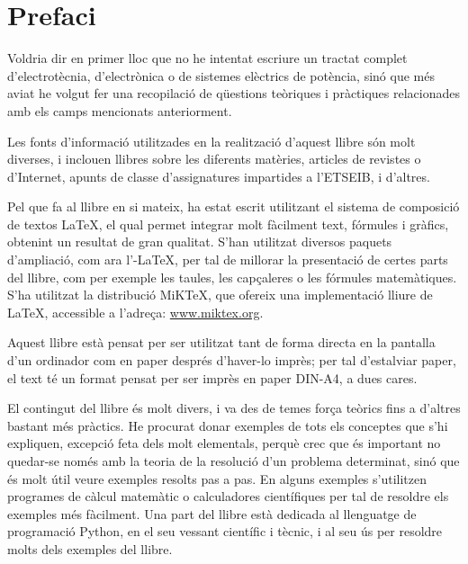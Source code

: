 \chapter*{Prefaci} 

   Voldria dir en primer lloc que no he intentat escriure un tractat complet
   d'electrotècnia, d'electrònica o de sistemes elèctrics de potència, sinó que més aviat
   he volgut
   fer una recopilació de qüestions teòriques i pràctiques relacionades amb els camps mencionats
   anteriorment.

   Les fonts d'informació utilitzades en la realització d'aquest llibre són molt diverses,
   i inclouen llibres sobre les diferents matèries, articles de revistes o d'Internet,
   apunts de classe d'assignatures impartides a l'ETSEIB, i d'altres.

   Pel que fa al llibre en si mateix, ha estat escrit utilitzant el sistema de composició de
   textos \LaTeX, el qual
   permet integrar molt fàcilment text, fórmules i gràfics, obtenint un resultat de
   gran qualitat. S'han utilitzat diversos paquets d'ampliació, com ara
   l'\AmS-\LaTeX,
   per tal de millorar la presentació de certes parts del
   llibre, com per exemple les taules, les capçaleres o les fórmules matemàtiques. S'ha utilitzat la distribució MiK\TeX, que ofereix una implementació lliure de \LaTeX , accessible a l'adreça: \href{http://www.miktex.org/}{www.miktex.org}.

   Aquest llibre està pensat per  ser utilitzat tant de forma directa en la pantalla d'un
   ordinador com en paper després d'haver-lo imprès; per tal d'estalviar paper, el text
   té un format pensat per  ser imprès en paper DIN-A4, a dues cares.

    El contingut del llibre és molt divers, i va des de temes força teòrics fins a
    d'altres bastant més pràctics. He procurat donar exemples de tots els conceptes
    que s'hi expliquen, excepció feta dels molt elementals, perquè crec que és important
     no quedar-se només amb la teoria de  la resolució d'un problema determinat, sinó que
     és molt útil veure exemples resolts pas a pas. En alguns exemples s'utilitzen programes de càlcul matemàtic o calculadores científiques per tal de resoldre els exemples més fàcilment. Una part  del llibre està dedicada al llenguatge de programació Python, en el seu vessant científic i tècnic, i al seu ús  per resoldre molts dels exemples del llibre.


